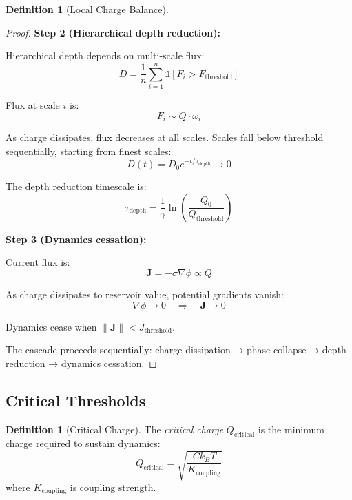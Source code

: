 \documentclass[12pt,a4paper]{article}
\theoremstyle{plain}
\theoremstyle{definition}
\newtheorem{definition}[theorem]{Definition}
\theoremstyle{remark}
\begin{document}
\begin{definition}[Local Charge Balance]
\begin{proof}
\textbf{Step 2 (Hierarchical depth reduction):}

Hierarchical depth depends on multi-scale flux:
\begin{equation}
D = \frac{1}{n} \sum_{i=1}^{n} \mathbb{1}[F_i > F_{\text{threshold}}]
\end{equation}

Flux at scale $i$ is:
\begin{equation}
F_i \sim Q \cdot \omega_i
\end{equation}

As charge dissipates, flux decreases at all scales. Scales fall below threshold sequentially, starting from finest scales:
\begin{equation}
D(t) = D_0 e^{-t/\tau_{\text{depth}}} \to 0
\end{equation}

The depth reduction timescale is:
\begin{equation}
\tau_{\text{depth}} = \frac{1}{\gamma} \ln\left(\frac{Q_0}{Q_{\text{threshold}}}\right)
\end{equation}

\textbf{Step 3 (Dynamics cessation):}

Current flux is:
\begin{equation}
\mathbf{J} = -\sigma \nabla \phi \propto Q
\end{equation}

As charge dissipates to reservoir value, potential gradients vanish:
\begin{equation}
\nabla \phi \to 0 \quad \Rightarrow \quad \mathbf{J} \to 0
\end{equation}

Dynamics cease when $\|\mathbf{J}\| < J_{\text{threshold}}$.

The cascade proceeds sequentially: charge dissipation → phase collapse → depth reduction → dynamics cessation.
\end{proof}

\subsection{Critical Thresholds}

\begin{definition}[Critical Charge]
\label{def:critical_charge}
The \emph{critical charge} $Q_{\text{critical}}$ is the minimum charge required to sustain dynamics:
\begin{equation}
Q_{\text{critical}} = \sqrt{\frac{C k_B T}{K_{\text{coupling}}}}
\end{equation}
where $K_{\text{coupling}}$ is coupling strength.
\end{definition}


\end{definition}
\end{document}
